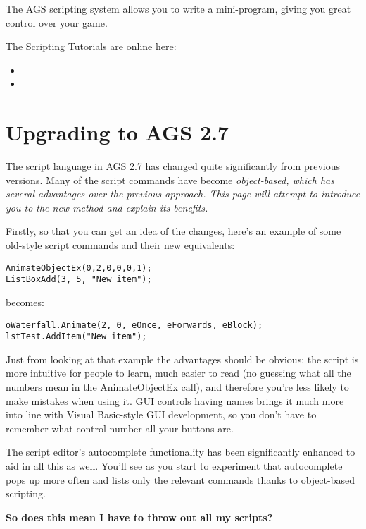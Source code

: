 The AGS scripting system allows you to write a mini-program, giving you great
control over your game.

The Scripting Tutorials are online here:
\begin{itemize}
\item {}
\item {}
\end{itemize}

\section{Upgrading to AGS 2.7}\label{UpgradingTo27}%

The script language in AGS 2.7 has changed quite significantly from previous versions.
Many of the script commands have become \it{object-based}, which has several advantages
over the previous approach. This page will attempt to introduce you to the new method and
explain its benefits.

Firstly, so that you can get an idea of the changes, here's an example of some old-style
script commands and their new equivalents:
\begin{verbatim}
AnimateObjectEx(0,2,0,0,0,1);
ListBoxAdd(3, 5, "New item");
\end{verbatim}
becomes:
\begin{verbatim}
oWaterfall.Animate(2, 0, eOnce, eForwards, eBlock);
lstTest.AddItem("New item");
\end{verbatim}

Just from looking at that example the advantages should be obvious; the script is more
intuitive for people to learn, much easier to read (no guessing what all the numbers mean
in the AnimateObjectEx call), and therefore you're less likely to make mistakes when using it.
GUI controls having names brings it much more into line with Visual Basic-style GUI
development, so you don't have to remember what control number all your buttons are.

The script editor's autocomplete functionality has been significantly enhanced to aid
in all this as well. You'll see as you start to experiment that autocomplete pops up more
often and lists only the relevant commands thanks to object-based scripting.

\bf{So does this mean I have to throw out all my scripts?}

